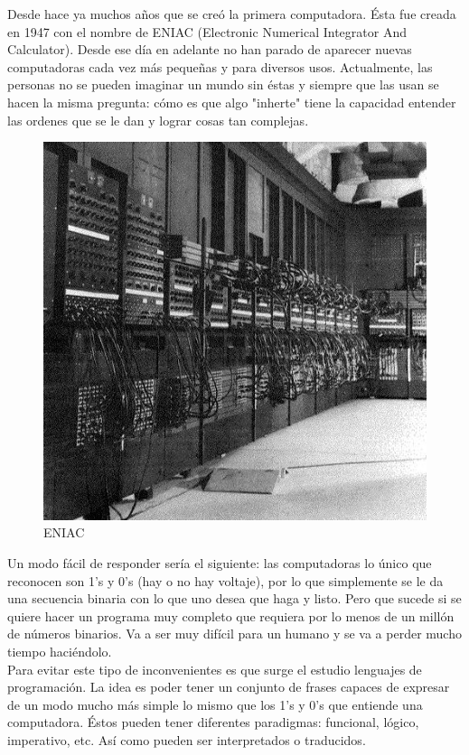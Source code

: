 \documentclass[11pt, spanish]{report}
\begin{document}
Desde hace ya muchos a\~nos que se cre\'o la primera computadora. \'Esta fue creada en 1947 con el nombre de ENIAC (Electronic Numerical 
Integrator And Calculator). Desde ese d\'ia en adelante no han parado de aparecer nuevas computadoras cada vez m\'as peque\~nas y para 
diversos usos. Actualmente, las personas no se pueden imaginar un mundo sin \'estas y siempre que las usan se hacen la misma pregunta: 
c\'omo es que algo "inherte" tiene la capacidad entender las ordenes que se le dan y lograr cosas tan complejas.\\

\begin{figure}[htp]
  \centering
  \mbox{\includegraphics[scale=0.5]{eniac.jpg}}
  \caption{ENIAC}
  \label{fig eniac}
\end{figure}
  
Un modo f\'acil de responder ser\'ia el siguiente: las computadoras  lo \'unico que reconocen son 1's y 0's (hay o no hay voltaje), por lo 
que simplemente se le da una secuencia binaria con lo que uno desea que haga y listo. Pero que sucede si se quiere hacer un programa muy 
completo que requiera por lo menos de un mill\'on de n\'umeros binarios. Va a ser muy dif\'icil para un humano y se va a perder mucho 
tiempo haci\'endolo.\\

Para evitar este tipo de inconvenientes es que surge el estudio lenguajes de programaci\'on. La idea es poder tener un conjunto de frases 
capaces de expresar de un modo mucho m\'as simple lo mismo que los 1's y 0's que entiende una computadora. \'Estos pueden tener diferentes 
paradigmas: funcional, l\'ogico, imperativo, etc. As\'i como pueden ser interpretados o traducidos.\\
\end{document}

